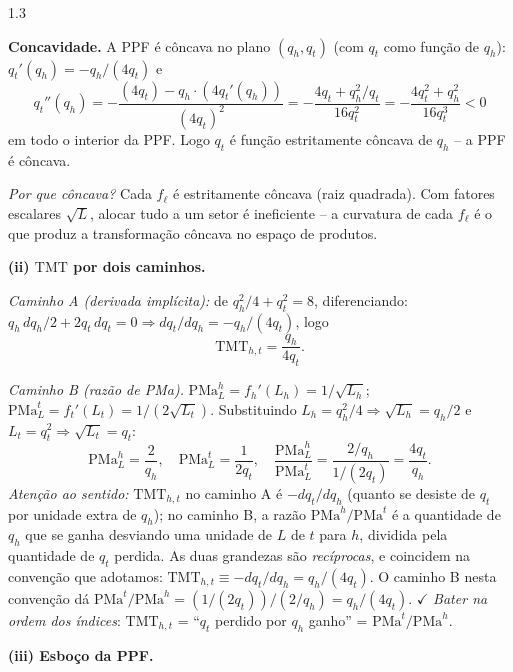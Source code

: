 \documentclass[11pt,addpoints]{exam}
\newcommand{\TMT}{\text{TMT}}
\begin{document}
\begin{spacing}{1.3}
\begin{questions}
\begin{parts}
\begin{solution}
\textbf{Concavidade.} A PPF é côncava no plano $(q_h, q_t)$ (com $q_t$ como função de $q_h$): $q_t'(q_h) = -q_h/(4 q_t)$ e
\[
    q_t''(q_h) = -\frac{(4 q_t) - q_h\cdot (4 q_t'(q_h))}{(4 q_t)^2}
    = -\frac{4 q_t + q_h^2/q_t}{16 q_t^2} = -\frac{4 q_t^2 + q_h^2}{16 q_t^3} < 0
\]
em todo o interior da PPF. Logo $q_t$ é função estritamente côncava de $q_h$ -- a PPF é côncava.

\textit{Por que côncava?} Cada $f_\ell$ é estritamente côncava (raiz quadrada). Com fatores escalares $\sqrt{L}$, alocar tudo a um setor é ineficiente -- a curvatura de cada $f_\ell$ é o que produz a transformação côncava no espaço de produtos.

\textbf{(ii) $\TMT$ por dois caminhos.}

\emph{Caminho A (derivada implícita):} de $q_h^2/4 + q_t^2 = 8$, diferenciando: $q_h\, dq_h/2 + 2 q_t\, dq_t = 0 \Rightarrow dq_t/dq_h = -q_h/(4 q_t)$, logo
\[
    \TMT_{h, t} = \frac{q_h}{4 q_t}.
\]

\emph{Caminho B (razão de PMa).} $\mathrm{PMa}_L^{h} = f_h'(L_h) = 1/\sqrt{L_h}$; $\mathrm{PMa}_L^{t} = f_t'(L_t) = 1/(2\sqrt{L_t})$. Substituindo $L_h = q_h^2/4 \Rightarrow \sqrt{L_h} = q_h/2$ e $L_t = q_t^2 \Rightarrow \sqrt{L_t} = q_t$:
\[
    \mathrm{PMa}_L^{h} = \frac{2}{q_h},\quad \mathrm{PMa}_L^{t} = \frac{1}{2 q_t},\quad
    \frac{\mathrm{PMa}_L^{h}}{\mathrm{PMa}_L^{t}} = \frac{2/q_h}{1/(2 q_t)} = \frac{4 q_t}{q_h}.
\]
\textit{Atenção ao sentido:} $\TMT_{h, t}$ no caminho A é $-dq_t/dq_h$ (quanto se desiste de $q_t$ por unidade extra de $q_h$); no caminho B, a razão $\mathrm{PMa}^h/\mathrm{PMa}^t$ é a quantidade de $q_h$ que se ganha desviando uma unidade de $L$ de $t$ para $h$, dividida pela quantidade de $q_t$ perdida. As duas grandezas são \emph{recíprocas}, e coincidem na convenção que adotamos: $\TMT_{h, t} \equiv -dq_t/dq_h = q_h/(4q_t)$. O caminho B nesta convenção dá $\mathrm{PMa}^t/\mathrm{PMa}^h = (1/(2q_t))/(2/q_h) = q_h/(4 q_t)$. $\checkmark$ \emph{Bater na ordem dos índices}: $\TMT_{h,t}$ = ``$q_t$ perdido por $q_h$ ganho'' = $\mathrm{PMa}^t/\mathrm{PMa}^h$.

\textbf{(iii) Esboço da PPF.}


\end{solution}
\end{parts}
\end{questions}
\end{spacing}
\end{document}
